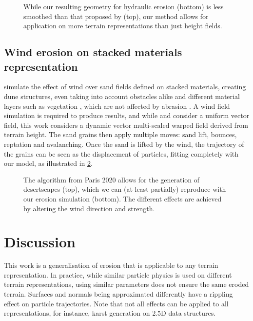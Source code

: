 \begin{figure}
    \caption{While our resulting geometry for hydraulic erosion (bottom) is less smoothed than that proposed by \cite{Mei2007} (top), our method allows for application on more terrain representations than just height fields.}
    \label{fig:erosion-screen-mei2007-1}
\end{figure}

\subsection{Wind erosion on stacked materials representation}

\citep{Paris2019b} simulate the effect of wind over sand fields defined on stacked materials, creating dune structures, even taking into account obstacles alike \cite{Roa2004} and different material layers such as vegetation \cite{Cordonnier2017a}, which are not affected by abrasion \cite{Paris2019b}. A wind field simulation is required to produce results, and while \cite{Roa2004} and \cite{Onoue2000} consider a uniform vector field, this work considers a dynamic vector multi-scaled warped field derived from terrain height. The sand grains then apply multiple moves: sand lift, bounces, reptation and avalanching. Once the sand is lifted by the wind, the trajectory of the grains can be seen as the displacement of particles, fitting completely with our model, as illustrated in \cref{fig:erosion-screen-paris2020}.

\begin{figure}
    \caption{The algorithm from Paris 2020 allows for the generation of desertscapes (top), which we can (at least partially) reproduce with our erosion simulation (bottom). The different effects are achieved by altering the wind direction and strength.}
    \label{fig:erosion-screen-paris2020}
\end{figure}




\section{Discussion}
This work is a generalisation of erosion that is applicable to any terrain representation. In practice, while similar particle physics is used on different terrain representations, using similar parameters does not ensure the same eroded terrain. Surfaces and normals being approximated differently have a rippling effect on particle trajectories.  
Note that not all effects can be applied to all representations, for instance, karst generation on 2.5D data structures.

